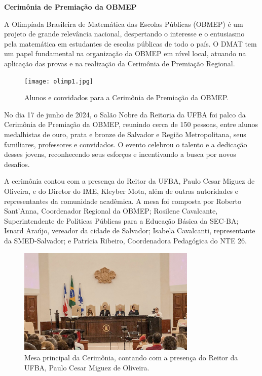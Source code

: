 \documentclass{hipatia}
\begin{document}
\vspace{0.5cm}

{\bf \noindent Cerimônia de Premiação da OBMEP}

\vspace{0.5cm}

A Olimpíada Brasileira de Matemática das Escolas Públicas (OBMEP) é um projeto de grande relevância nacional, despertando o interesse e o entusiasmo pela matemática em estudantes de escolas públicas de todo o país. O DMAT tem um papel fundamental na organização da OBMEP em nível local, atuando na aplicação das provas e na realização da Cerimônia de Premiação Regional.

\begin{figure}[htb]
    \centering
    \texttt{[image: olimp1.jpg]}
    \caption{Alunos e convidados para a Cerimônia de Premiação da OBMEP.}
 \label{olimp1}
\end{figure}

No dia 17 de junho de 2024, o Salão Nobre da Reitoria da UFBA foi palco da Cerimônia de Premiação da OBMEP, reunindo cerca de 150 pessoas, entre alunos medalhistas de ouro, prata e bronze de Salvador e Região Metropolitana, seus familiares, professores e convidados. O evento celebrou o talento e a dedicação desses jovens, reconhecendo seus esforços e incentivando a busca por novos desafios.



A cerimônia contou com a presença do Reitor da UFBA, Paulo Cesar Miguez de Oliveira, e do Diretor do IME, Kleyber Mota, além de outras autoridades e representantes da comunidade acadêmica. A mesa foi composta por Roberto Sant'Anna, Coordenador Regional da OBMEP; Rosilene Cavalcante, Superintendente de Políticas Públicas para a Educação Básica da SEC-BA; Isnard Araújo, vereador da cidade de Salvador; Isabela Cavalcanti, representante da SMED-Salvador; e Patrícia Ribeiro, Coordenadora Pedagógica do NTE 26.

\begin{figure}[htb]
    \centering
    \includegraphics[width=8.5cm]{olimp2.jpeg}
    \caption{Mesa principal da Cerimônia, contando com a presença do Reitor da UFBA, Paulo Cesar Miguez de Oliveira.}
 \label{olimp2}
\end{figure}
\end{document}

